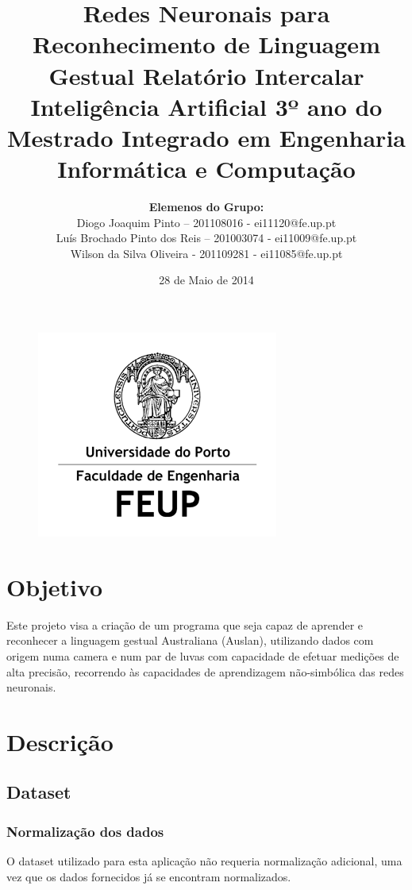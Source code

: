 \documentclass[10pt,a4paper]{article}
\title{\Huge\textbf{Redes Neuronais para Reconhecimento de Linguagem Gestual}\linebreak\linebreak\linebreak
\Large\textbf{Relatório Intercalar}\linebreak\linebreak
\Large{Inteligência Artificial}\linebreak
\Large{3º ano do Mestrado Integrado em Engenharia Informática e Computação} \linebreak \linebreak}
\author{\textbf{Elemenos do Grupo:}\\ Diogo Joaquim Pinto – 201108016 - ei11120@fe.up.pt \\ Luís Brochado Pinto dos Reis – 201003074 - ei11009@fe.up.pt \\ Wilson da Silva Oliveira - 201109281 - ei11085@fe.up.pt}
\date{28 de Maio de 2014}
\begin{document}
\begin{figure}
\centering
\includegraphics[width=0.7\linewidth]{./LogoFeup}
\end{figure}

\maketitle

\tableofcontents

\newpage

\section{Objetivo}

Este projeto visa a criação de um programa que seja capaz de aprender e reconhecer a linguagem gestual Australiana  (Auslan), utilizando dados com origem numa camera e num par de luvas com capacidade de efetuar medições de alta precisão, recorrendo às capacidades de aprendizagem não-simbólica das redes neuronais.

\section{Descrição}

\subsection{Dataset}

\subsubsection{Normalização dos dados}

O dataset utilizado para esta aplicação não requeria normalização adicional, uma vez que os dados fornecidos já se encontram normalizados. 
\end{document}
